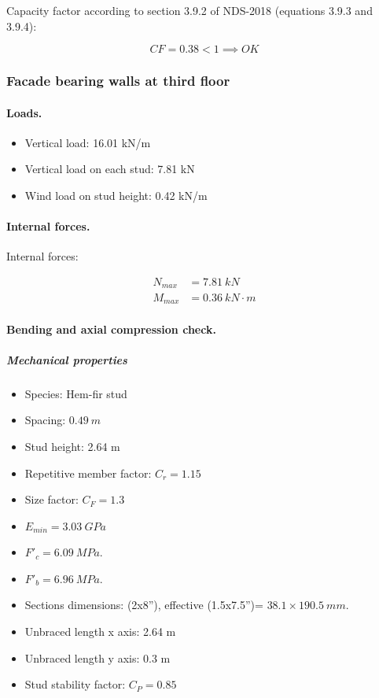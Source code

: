 \noindent Capacity factor according to section 3.9.2 of NDS-2018 (equations 3.9.3 and 3.9.4):

\begin{equation}
  CF= 0.38 < 1 \implies OK
\end{equation}

\subsubsection{Facade bearing walls at third floor}

\paragraph{Loads.}

\begin{itemize}
\item Vertical load: 16.01 kN/m
\item Vertical load on each stud: 7.81 kN
\item Wind load on stud height: 0.42 kN/m
\end{itemize}

\paragraph{Internal forces.}

\noindent Internal forces:

\begin{align}
  N_{max}&= 7.81\ kN \\
  M_{max}&= 0.36\ kN \cdot m
\end{align}

\paragraph{Bending and axial compression check.}

\subparagraph{Mechanical properties}

\begin{itemize}
\item Species: Hem-fir stud
\item Spacing: $0.49\ m$
\item Stud height: 2.64 m
\item Repetitive member factor: $C_r= 1.15$
\item Size factor: $C_F= 1.3$
\item $E_{min}= 3.03\ GPa$
\item $F'_c= 6.09\ MPa$.
\item $F'_b= 6.96\ MPa$.
\item Sections dimensions: (2x8''), effective (1.5x7.5'')= $38.1 \times 190.5\ mm$.
\item Unbraced length x axis: 2.64 m
\item Unbraced length y axis: 0.3 m
\item Stud stability factor: $C_P= 0.85$
\end{itemize}

